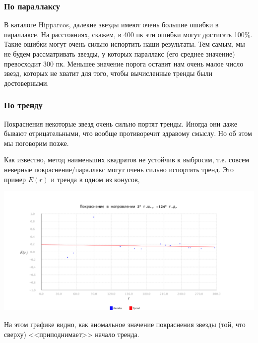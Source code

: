 \documentclass[14pt]{article}
\begin{document}
            \subsubsection{По параллаксу}
                В каталоге Hipparcos, далекие звезды имеют очень большие ошибки в параллаксе. На расстояниях, скажем, в 400 пк эти ошибки могут достигать 100\%. Такие ошибки могут очень сильно испортить наши результаты. Тем самым, мы не будем рассматривать звезды, у которых параллакс (его среднее значение) превосходит 300 пк. Меньшее значение порога оставит нам очень малое число звезд, которых не хватит для того, чтобы вычисленные тренды были достоверными.
            \subsubsection{По тренду}
                Покраснения некоторые звезд очень сильно портят тренды. Иногда они даже бывают отрицательными, что вообще противоречит здравому смыслу. Но об этом мы поговорим позже.
                
                Как известно, метод наименьших квадратов не устойчив к выбросам, т.е. совсем неверные покраснение/параллакс могут очень сильно испортить тренд. Это пример $E(r)$ и тренда в одном из конусов, 
                \begin{center}
                    \includegraphics[scale=0.35]{ls.png}
                \end{center}
                
                На этом графике видно, как аномальное значение покраснения звезды (той, что сверху) <<приподнимает>> начало тренда.
                
\end{document}
